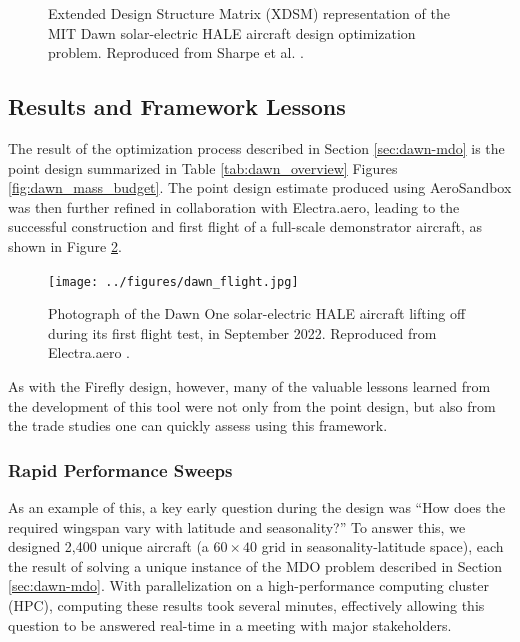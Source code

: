 \begin{figure}[h]
    \centering
    \begin{adjustbox}{width=\textwidth,center,trim={3.5in 0 0.25in 0}}
        
    \end{adjustbox}
    \caption{Extended Design Structure Matrix (XDSM) representation of the MIT Dawn solar-electric HALE aircraft design optimization problem. Reproduced from Sharpe et al. \cite{sharpe_optimization_2021}.}
    \label{fig:dawn_xdsm}
\end{figure}

\subsection{Results and Framework Lessons}

The result of the optimization process described in Section \ref{sec:dawn-mdo} is the point design summarized in Table \ref{tab:dawn_overview} Figures \ref{fig:dawn_mass_budget}. The point design estimate produced using AeroSandbox was then further refined in collaboration with Electra.aero, leading to the successful construction and first flight of a full-scale demonstrator aircraft, as shown in Figure \ref{fig:dawn_flight}.

\begin{figure}[h]
    \centering
    \texttt{[image: ../figures/dawn\_flight.jpg]}
    \caption{Photograph of the Dawn One solar-electric HALE aircraft lifting off during its first flight test, in September 2022. Reproduced from Electra.aero \cite{electra_dawn_flight}.}
    \label{fig:dawn_flight}
\end{figure}

As with the Firefly design, however, many of the valuable lessons learned from the development of this tool were not only from the point design, but also from the trade studies one can quickly assess using this framework.

\subsubsection*{Rapid Performance Sweeps}

As an example of this, a key early question during the design was ``How does the required wingspan vary with latitude and seasonality?'' To answer this, we designed 2,400 unique aircraft (a $60\times40$ grid in seasonality-latitude space), each the result of solving a unique instance of the MDO problem described in Section \ref{sec:dawn-mdo}. With parallelization on a high-performance computing cluster (HPC), computing these results took several minutes, effectively allowing this question to be answered real-time in a meeting with major stakeholders.

